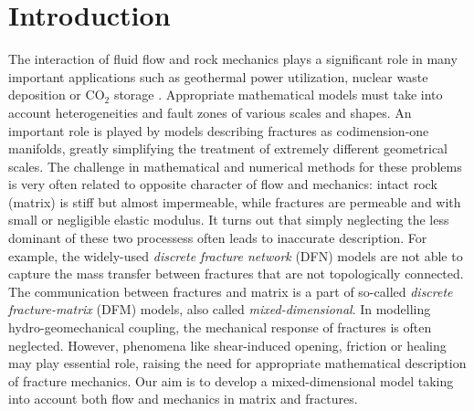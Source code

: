 \documentclass[a4paper]{article}
\numberwithin{equation}{section}
\begin{document}
\section{Introduction}



The interaction of fluid flow and rock mechanics plays a significant role in many important applications such as geothermal power utilization, nuclear waste deposition or CO${}_2$ storage \cite{rutqvist2003role}.
Appropriate mathematical models must take into account heterogeneities and fault zones of various scales and shapes.
An important role is played by models describing fractures as codimension-one manifolds, greatly simplifying the treatment of extremely different geometrical scales.
The challenge in mathematical and numerical methods for these problems is very often related to opposite character of flow and mechanics: intact rock (matrix) is stiff but almost impermeable, while fractures are permeable and with small or negligible elastic modulus.
It turns out that simply neglecting the less dominant of these two processess often leads to inaccurate description.
For example, the widely-used \textit{discrete fracture network} (DFN) models are not able to capture the mass transfer between fractures that are not topologically connected.
The communication between fractures and matrix is a part of so-called \textit{discrete fracture-matrix} (DFM) models, also called \textit{mixed-dimensional}.
In modelling hydro-geomechanical coupling, the mechanical response of fractures is often neglected.
However, phenomena like shear-induced opening, friction or healing may play essential role, raising the need for appropriate mathematical description of fracture mechanics.
Our aim is to develop a mixed-dimensional model taking into account both flow and mechanics in matrix and fractures.
\end{document}
